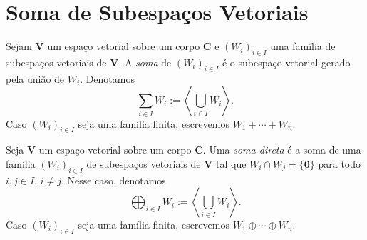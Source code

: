 \section{Soma de Subespaços Vetoriais}

\begin{defi}
	Sejam $\bm V$ um espaço vetorial sobre um corpo $\bm C$ e $(W_i)_{i \in I}$ uma família de subespaços vetoriais de $\bm V$. A \emph{soma} de $(W_i)_{i \in I}$ é o subespaço vetorial gerado pela união de $W_i$. Denotamos
	\begin{equation*}
	\sum_{i \in I} W_i := \left\langle \bigcup_{i \in I} W_i \right\rangle.
	\end{equation*}
Caso $(W_i)_{i \in I}$ seja uma família finita, escrevemos $W_1 + \cdots + W_n$.
\end{defi}

\begin{defi}
	Seja $\bm V$ um espaço vetorial sobre um corpo $\bm C$. Uma \emph{soma direta} é a soma de uma família $(W_i)_{i \in I}$ de subespaços vetoriais de $\bm V$ tal que $W_i \cap W_j = \{\bm 0\}$ para todo $i,j \in I$, $i \neq j$. Nesse caso, denotamos
	\begin{equation*}
	\bigoplus_{i \in I} W_i := \left\langle \bigcup_{i \in I} W_i\right\rangle.
	\end{equation*}
Caso $(W_i)_{i \in I}$ seja uma família finita, escrevemos $W_1 \oplus \cdots \oplus W_n$.
\end{defi}

